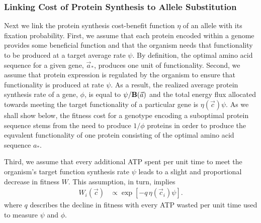 \documentclass{article}
\newcommand{\Func}{\ensuremath{\text{\textbf{B}}}\xspace}
\newcommand{\aopt}{\ensuremath{a_*}\xspace}
\newcommand{\aoptvec}{\ensuremath{\Vec{a}_*}\xspace}
\newcommand{\avec}{\ensuremath{\Vec{a}}\xspace}
\newcommand{\cveci}{\ensuremath{\cvec_i}\xspace}
\newcommand{\cvec}{\ensuremath{\Vec{c}}\xspace}
\begin{document}
\subsubsection*{Linking Cost of Protein Synthesis to Allele Substitution}
Next we link the protein synthesis cost-benefit function $\eta$ of an allele with its fixation probability.
First, we assume that each protein encoded within a genome provides some beneficial function and that the organism needs that functionality to be produced at a target average rate $\psi$.
By definition, the optimal amino acid sequence for a given gene, \aoptvec, produces one unit of functionality.
Second, we assume that protein expression is regulated by the organism to ensure that functionality is produced at rate $\psi$.
As a result, the realized average protein synthesis rate of a gene, $\phi$, is equal to $\psi/\Func(\avec)$ and the total energy flux allocated towards meeting the target functionality of a particular gene is $\eta(\cvec) \psi$. 
As we shall show below, the fitness cost for a genotype encoding a suboptimal protein sequence stems from the need to produce $1/\phi$ proteins in order to produce the equvalent functionality of one protein consisting of the optimal amino acid sequence \aopt.


Third, we assume that every additional ATP spent per unit time to meet the organism's target function synthesis rate $\psi$ leads to a slight and proportional decrease in fitness $W$.
This assumption, in turn, implies 
\begin{align}
  W_i\left(\cvec\right) &\propto \exp\left[- q \, \eta(\cveci) \psi\right].
\end{align}
where $q$ describes the decline in fitness with every ATP wasted per unit time used to measure $\psi$ and $\phi$.
\end{document}
